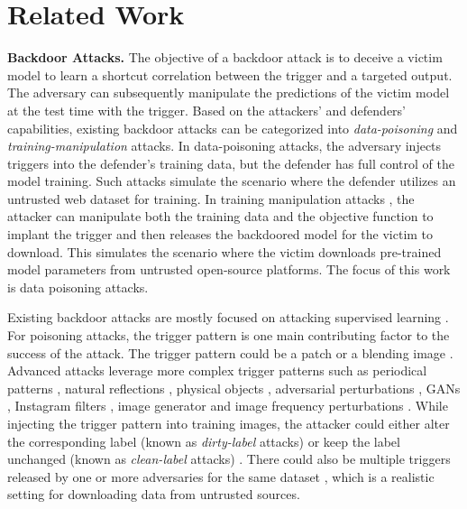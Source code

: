 \section{Related Work}
\noindent\textbf{Backdoor Attacks.} The objective of a backdoor attack is to deceive a victim model to learn a shortcut correlation between the trigger and a targeted output. The adversary can subsequently manipulate the predictions of the victim model at the test time with the trigger. 
Based on the attackers' and defenders' capabilities, existing backdoor attacks can be categorized into \emph{data-poisoning} and \emph{training-manipulation} attacks. 
In data-poisoning attacks, the adversary injects triggers into the defender's training data, but the defender has full control of the model training. Such attacks simulate the scenario where the defender utilizes an untrusted web dataset for training.
In training manipulation attacks \citep{lin2020composite,shumailov2021manipulating,bagdasaryan2021blind,nguyen2021wanet,doan2021lira,wang2022bppattack}, the attacker can manipulate both the training data and the objective function to implant the trigger and then
releases the backdoored model for the victim to download. This simulates the scenario where the victim downloads pre-trained model parameters from untrusted open-source platforms. 
The focus of this work is data poisoning attacks. 

Existing backdoor attacks are mostly focused on attacking supervised learning \citep{gu2017badnets,chen2017targeted,liu2018trojaning}. 
For poisoning attacks, the trigger pattern is one main contributing factor to the success of the attack. The trigger pattern could be a patch \citep{gu2017badnets} or a blending image \citep{chen2017targeted}. Advanced attacks leverage more complex trigger patterns such as periodical patterns \citep{barni2019new}, natural reflections \citep{liu2020reflection}, physical objects \citep{li2020rethinking,wenger2021backdoor}, adversarial perturbations \citep{turner2018clean,zhao2020clean}, GANs \citep{cheng2020deep}, Instagram filters \citep{liu2019abs}, image generator \citep{sun2024backdoor} and image frequency perturbations \citep{zeng2021rethinking,li2023embarrassingly}. 
While injecting the trigger pattern into training images, the attacker could either alter the corresponding label (known as {\em dirty-label} attacks) or keep the label unchanged (known as {\em clean-label} attacks) \citep{turner2018clean,zhao2020clean}.
There could also be multiple triggers released by one or more adversaries for the same dataset \citep{li2024multi}, which is a realistic setting for downloading data from untrusted sources. 

